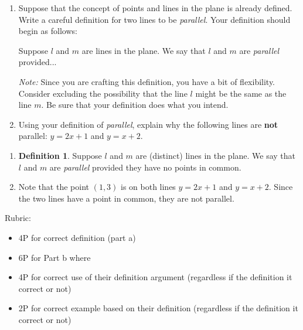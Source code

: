 \documentclass{article}
\theoremstyle{definition}
\newtheorem*{definition}{Definition}
\begin{document}
\begin{question}
    \begin{enumerate}
        \item 
        Suppose that the concept of points and lines
        in the plane is already defined.  Write a careful
        definition for two lines to be \emph{parallel}. 
        Your definition should begin as
        follows:
        \begin{center}
        Suppose $l$ and $m$ are lines in the plane. We say that $l$ and $m$ are \emph{parallel} provided...
        \end{center}

        {\emph{Note:} Since you are crafting this definition, you have a bit of flexibility.  Consider excluding the possibility that the line $l$ might be the same as the line $m$. Be sure that your definition does what you intend.}

        \item Using your definition of \emph{parallel}, explain why the following lines are \textbf{not} parallel: $y=2x+1$ and $y=x+2$.
    \end{enumerate}
\end{question}
\begin{solution}
\begin{enumerate}
\item \begin{definition}Suppose $l$ and $m$ are (distinct) lines in the plane. We say that $l$ and $m$ are \emph{parallel} provided they have no points in common.\end{definition}
\item Note that the point $(1, 3)$ is on both lines $y=2x+1$ and $y=x+2$. Since the two lines have a point in common, they are not parallel.
\end{enumerate}

{\color{red} Rubric:
\begin{itemize}
\item 4P for correct definition (part a)
\item 6P for Part b where
\item 4P for correct use of their definition argument (regardless if the definition it correct or not)
\item 2P for correct example based on their definition (regardless if the definition it correct or not)
\end{itemize}}
\end{solution}
\end{document}

